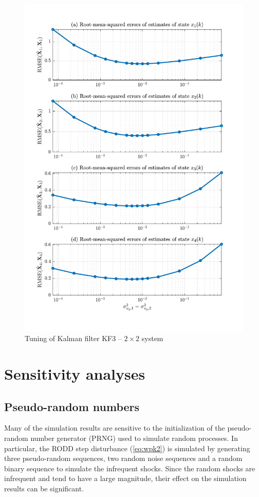 \begin{figure}[htp]
	\centering
	\includegraphics[width=14cm]{images/rod_obs_sim2_3KF_Q_seed_0.pdf}
	\caption{Tuning of Kalman filter KF3 – $2\times2$ system}
	\label{fig:sim-sys-2x2-KF3-tuning}
\end{figure}
	

\section{Sensitivity analyses}

\subsection{Pseudo-random numbers}

Many of the simulation results are sensitive to the initialization of the pseudo-random number generator (PRNG) used to simulate random processes. In particular, the \gls{RODD} step disturbance (\ref{eq:wpk2}) is simulated by generating three pseudo-random sequences, two random noise sequences and a random binary sequence to simulate the infrequent shocks.  Since the random shocks are infrequent and tend to have a large magnitude, their effect on the simulation results can be significant.


